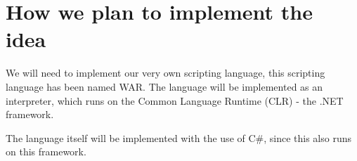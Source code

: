 \section*{How we plan to implement the idea}
We will need to implement our very own scripting language, this scripting language has been named WAR.
The language will be implemented as an interpreter, which runs on the Common Language Runtime (CLR) - the .NET framework.

The language itself will be implemented with the use of C\#, since this also runs on this framework.
